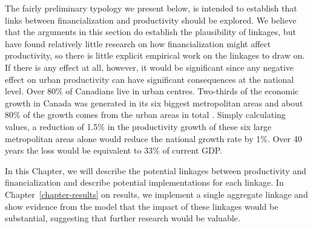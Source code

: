 The fairly preliminary typology we present below, is intended to establish that links between financialization and productivity should be explored. We believe that the arguments in this section do establish the plausibility of linkages, but have found relatively little research on how financialization might affect productivity, %
so there is little explicit empirical work on the linkages to draw on. 
If there is any effect at all, however, it would be significant 
since any negative effect on urban productivity can have significant consequences at the national level. Over 80\% of Canadians live in urban centres. Two-thirds of the economic growth in Canada was generated in its six biggest metropolitan areas and about 80\% of the growth comes from the urban areas in total \cite{w.fanImportanceCitiesEmphasis2010}. Simply calculating values, a reduction of 1.5\% in the productivity growth of these six large metropolitan areas alone would reduce the national growth rate by 1\%. Over 40 years the loss would be equivalent to 33\% of current GDP.

In this Chapter, we will describe the potential linkages between productivity and financialization and describe potential implementations for each linkage. In Chapter~\ref{chapter-results} on results, we implement a single aggregate linkage and show evidence from the model that the impact of these linkages would be substantial, suggesting that further research would be valuable.




